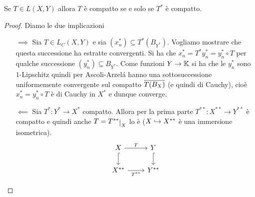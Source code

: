 \begin{theorem}[Shauder]\label{ThShauder}
Se $T\in L(X,Y)$ allora $T$ \`e compatto se e solo se $T^\ast$ \`e compatto.
\end{theorem}
\begin{proof}
Diamo le due implicazioni
\setlength{\leftmargini}{0cm}
\begin{itemize}
\item[$\boxed{\implies}$] Sia $T\in L_C(X,Y)$ e sia $(x_n^\ast)\subseteq T^\ast(B_{Y^\ast})$. Vogliamo mostrare che questa successione ha estratte convergenti. Si ha che $x^\ast_n=T^\ast y_n^\ast=y_n^\ast\circ T$ per qualche successione $(y_n^\ast)\subseteq B_{Y^\ast}$. Come funzioni $Y\to \mathbb{K}$ si ha che le $y_n^\ast$ sono $1$-Lipschitz quindi per Ascoli-Arzel\'a hanno una sottosuccessione uniformemente convergente sul compatto $\overline{T(B_X)}$ (e quindi di Cauchy), cio\`e $x_n^\ast =y_n^\ast\circ T$ \`e di Cauchy in $X^\ast$ e dunque converge.
\item[$\boxed{\impliedby}$] Sia $T^\ast:Y^\ast\to X^\ast$ compatto. Allora per la prima parte $T^{\ast\ast}:X^{\ast\ast}\to Y^{\ast\ast}$ \`e compatto e quindi anche $T=T^{\ast\ast}\res{X}$ lo \`e ($X\hookrightarrow X^{\ast\ast}$ \`e una immersione isometrica).
\[\begin{tikzcd}
	X & Y \\
	{X^{\ast\ast}} & {Y^{\ast\ast}}
	\arrow["T", from=1-1, to=1-2]
	\arrow[hook, from=1-1, to=2-1]
	\arrow[hook, from=1-2, to=2-2]
	\arrow["{T^{\ast\ast}}"', from=2-1, to=2-2]
\end{tikzcd}\]
\end{itemize}
\setlength{\leftmargini}{0.5cm}
\end{proof}







